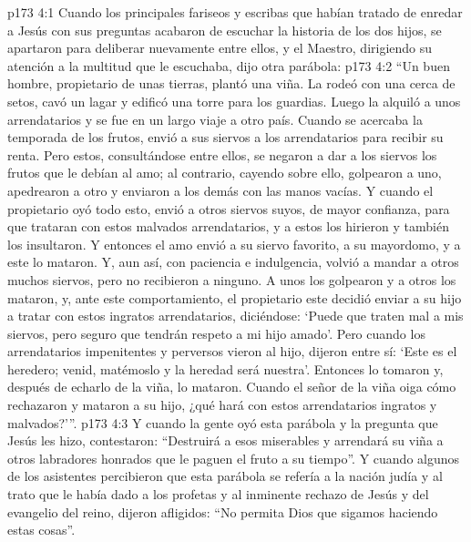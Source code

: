 \vs p173 4:1 Cuando los principales fariseos y escribas que habían tratado de enredar a Jesús con sus preguntas acabaron de escuchar la historia de los dos hijos, se apartaron para deliberar nuevamente entre ellos, y el Maestro, dirigiendo su atención a la multitud que le escuchaba, dijo otra parábola:
\vs p173 4:2 \pc “Un buen hombre, propietario de unas tierras, plantó una viña. La rodeó con una cerca de setos, cavó un lagar y edificó una torre para los guardias. Luego la alquiló a unos arrendatarios y se fue en un largo viaje a otro país. Cuando se acercaba la temporada de los frutos, envió a sus siervos a los arrendatarios para recibir su renta. Pero estos, consultándose entre ellos, se negaron a dar a los siervos los frutos que le debían al amo; al contrario, cayendo sobre ello, golpearon a uno, apedrearon a otro y enviaron a los demás con las manos vacías. Y cuando el propietario oyó todo esto, envió a otros siervos suyos, de mayor confianza, para que trataran con estos malvados arrendatarios, y a estos los hirieron y también los insultaron. Y entonces el amo envió a su siervo favorito, a su mayordomo, y a este lo mataron. Y, aun así, con paciencia e indulgencia, volvió a mandar a otros muchos siervos, pero no recibieron a ninguno. A unos los golpearon y a otros los mataron, y, ante este comportamiento, el propietario este decidió enviar a su hijo a tratar con estos ingratos arrendatarios, diciéndose: ‘Puede que traten mal a mis siervos, pero seguro que tendrán respeto a mi hijo amado’. Pero cuando los arrendatarios impenitentes y perversos vieron al hijo, dijeron entre sí: ‘Este es el heredero; venid, matémoslo y la heredad será nuestra’. Entonces lo tomaron y, después de echarlo de la viña, lo mataron. Cuando el señor de la viña oiga cómo rechazaron y mataron a su hijo, ¿qué hará con estos arrendatarios ingratos y malvados?’”.
\vs p173 4:3 \pc Y cuando la gente oyó esta parábola y la pregunta que Jesús les hizo, contestaron: “Destruirá a esos miserables y arrendará su viña a otros labradores honrados que le paguen el fruto a su tiempo”. Y cuando algunos de los asistentes percibieron que esta parábola se refería a la nación judía y al trato que le había dado a los profetas y al inminente rechazo de Jesús y del evangelio del reino, dijeron afligidos: “No permita Dios que sigamos haciendo estas cosas”.
